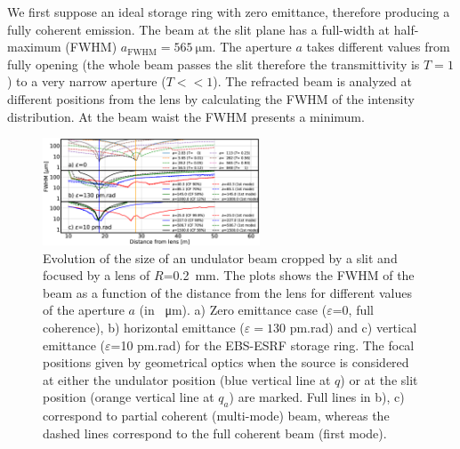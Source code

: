 \documentclass[9pt,twocolumn,twoside]{osajnl}
\begin{document}
We first suppose an ideal storage ring with zero emittance, therefore producing a fully coherent emission. The beam at the slit plane has a full-width at half-maximum (FWHM) $a_\text{FWHM}=\SI{565}{\micro\meter}$. The aperture $a$ takes different values from fully opening (the whole beam passes the slit therefore the transmittivity is $T=1$) to a very narrow aperture ($T << 1$). The refracted beam is analyzed at different positions from the lens by calculating the FWHM of the intensity distribution. At the beam waist the FWHM presents a minimum. 

\begin{figure}[htbp]
\hspace*{-1.0cm}
\includegraphics[width=0.575\textwidth]{figures/evolution.eps}
\caption{Evolution of the size of an undulator beam cropped by a slit and focused by a lens of $R$=\SI{0.2}{\milli\meter}.
The plots shows the FWHM of the beam  as a function of the distance from the lens for different values of the aperture $a$ (in \SI{}{\micro\meter}). 
a) Zero emittance case ($\varepsilon$=0, full coherence),
b) horizontal emittance ($\varepsilon=130$ pm.rad) and c) vertical emittance ($\varepsilon$=10 pm.rad) for the EBS-ESRF storage ring.
The focal positions given by geometrical optics when the source is considered at either the undulator position (blue vertical line at $q$) or at the slit position (orange vertical line at $q_a$) are marked.
Full lines in b), c) correspond to partial coherent (multi-mode) beam, whereas the dashed lines correspond to the full coherent beam (first mode).
}
\label{fig:oneTFund}
\end{figure}
\end{document}
